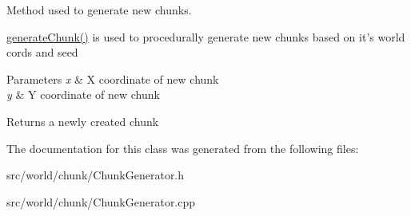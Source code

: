 Method used to generate new chunks. 

\hyperlink{classChunkGenerator_acb1e4d2b1d2d620a92fd3e311ddd42cf}{generate\-Chunk()} is used to procedurally generate new chunks based on it's world cords and seed 
\begin{DoxyParams}{Parameters}
{\em x} & X coordinate of new chunk \\
\hline
{\em y} & Y coordinate of new chunk \\
\hline
\end{DoxyParams}
\begin{DoxyReturn}{Returns}
a newly created chunk 
\end{DoxyReturn}


The documentation for this class was generated from the following files\-:\begin{DoxyCompactItemize}
\item 
src/world/chunk/Chunk\-Generator.\-h\item 
src/world/chunk/Chunk\-Generator.\-cpp\end{DoxyCompactItemize}
